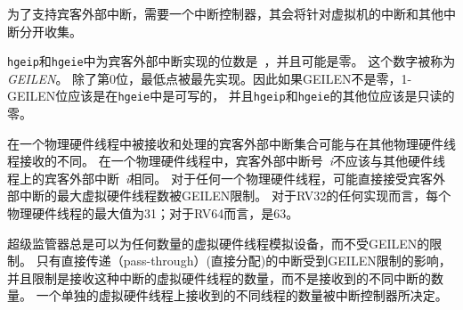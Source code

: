 \begin{commentary}
  为了支持宾客外部中断，需要一个中断控制器，其会将针对虚拟机的中断和其他中断分开收集。
\end{commentary}

{\tt hgeip}和{\tt hgeie}中为宾客外部中断实现的位数是\unspecified\ ，并且可能是零。
这个数字被称为\textit{GEILEN}。
除了第0位，最低点被最先实现。因此如果GEILEN不是零，1-GEILEN位应该是在{\tt hgeie}中是可写的，
并且{\tt hgeip}和{\tt hgeie}的其他位应该是只读的零。

\begin{commentary}

在一个物理硬件线程中被接收和处理的宾客外部中断集合可能与在其他物理硬件线程接收的不同。
在一个物理硬件线程中，宾客外部中断号~\textit{i}不应该与其他硬件线程上的宾客外部中断~\textit{i}相同。
对于任何一个物理硬件线程，可能直接接受宾客外部中断的最大虚拟硬件线程数被GEILEN限制。
对于RV32的任何实现而言，每个物理硬件线程的最大值为31；对于RV64而言，是63。

超级监管器总是可以为任何数量的虚拟硬件线程模拟设备，而不受GEILEN的限制。
只有直接传递（pass-through）(直接分配)的中断受到GEILEN限制的影响，并且限制是接收这种中断的虚拟硬件线程的数量，而不是接收到的不同中断的数量。
一个单独的虚拟硬件线程上接收到的不同线程的数量被中断控制器所决定。
\end{commentary}

